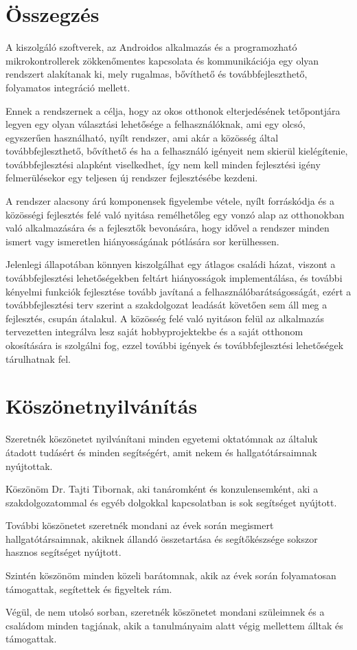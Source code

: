 \documentclass[
]{thesis-ekf}
\theoremstyle{definition}
\theoremstyle{remark}
\begin{document}
\chapter*{Összegzés}
A kiszolgáló szoftverek, az Androidos alkalmazás és a programozható mikrokontrollerek zökkenőmentes kapcsolata
és kommunikációja egy olyan rendszert alakítanak ki, mely rugalmas, bővíthető és továbbfejleszthető, folyamatos
integráció mellett.

Ennek a rendszernek a célja, hogy az okos otthonok elterjedésének tetőpontjára legyen egy olyan választási lehetősége a
felhasználóknak, ami egy olcsó, egyszerűen használható, nyílt rendszer, ami akár a közösség
által továbbfejleszthető, bővíthető és ha a felhasználó igényeit nem skierül kielégítenie, továbbfejlesztési
alapként viselkedhet, így nem kell minden fejlesztési igény felmerülésekor egy teljesen új rendszer fejlesztésébe
kezdeni.

A rendszer alacsony árú komponensek figyelembe vétele, nyílt forráskódja és a közösségi fejlesztés felé való nyitása
remélhetőleg egy vonzó alap az otthonokban való alkalmazására és a fejlesztők bevonására, hogy idővel a rendszer minden
ismert vagy ismeretlen hiányosságának pótlására sor kerülhessen.

Jelenlegi állapotában könnyen kiszolgálhat egy átlagos családi házat, viszont a továbbfejlesztési lehetőségekben
feltárt hiányosságok implementálása, és további kényelmi funkciók fejlesztése tovább javítaná a felhasználóbarátságosságát, ezért a továbbfejlesztési terv szerint a szakdolgozat leadását követően sem áll meg a
fejlesztés, csupán átalakul. A közösség felé való nyitáson felül az alkalmazás tervezetten integrálva lesz
saját hobbyprojektekbe és a saját otthonom okosítására is szolgálni fog, ezzel további igények és továbbfejlesztési
lehetőségek tárulhatnak fel.

\chapter*{Köszönetnyilvánítás}
Szeretnék köszönetet nyilvánítani minden egyetemi oktatómnak az általuk átadott tudásért és minden segítségért,
amit nekem és hallgatótársaimnak nyújtottak.
\par
Köszönöm Dr. Tajti Tibornak, aki tanáromként és konzulensemként, aki a szakdolgozatommal és egyéb dolgokkal kapcsolatban
is sok segítséget nyújtott.
\par
További köszönetet szeretnék mondani az évek során megismert hallgatótársaimnak, akiknek állandó összetartása és
segítőkészsége sokszor hasznos segítséget nyújtott.
\par
Szintén köszönöm minden közeli barátomnak, akik az évek során folyamatosan támogattak, segítettek és figyeltek rám.
\par
Végül, de nem utolsó sorban, szeretnék köszönetet mondani szüleimnek és a családom minden tagjának,
akik a tanulmányaim alatt végig mellettem álltak és támogattak.
\end{document}
